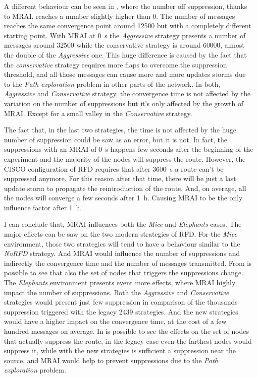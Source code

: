 A different behaviour can be seen in
,
where the number off suppression, thanks to \ac{MRAI}, reaches a number slightly
higher than \num{0}.
The number of messages reaches the same convergence point around \num{12500} but
with a completely different starting point.
With \ac{MRAI} at \SI{0}{\second} the \textit{Aggressive} strategy presents a number of
messages around \num{32500} while the conservative strategy is around \num{60000},
almost the double of the \textit{Aggressive} one.
This huge difference is caused by the fact that the \textit{conservative} strategy requires
more flaps to overcome the suppression threshold, and all those messages can
cause more and more updates storms due to the \textit{Path exploration} problem
in other parts of the network.
In both, \textit{Aggressive} and \textit{Conservative} strategy, the convergence
time is not affected by the variation on the number of suppressions but it's only
affected by the growth of \ac{MRAI}.
Except for a small valley in the \textit{Conservative} strategy.

The fact that, in the last two strategies, the time is not affected by the huge number
of suppression could be saw as an error, but it is not.
In fact, the suppressions with an \ac{MRAI} of \SI{0}{\second} happens
few seconds after the beginning of the experiment and the majority of the nodes
will suppress the route.
However, the CISCO configuration of \ac{RFD} requires that after \SI{3600}{\second} a route
can't be suppressed anymore.
For this reason after that time, there will be just a last update storm to propagate
the reintroduction of the route.
And, on average, all the nodes will converge a few seconds after \SI{1}{\hour}.
Causing \ac{MRAI} to be the only influence factor after \SI{1}{\hour}.

I can conclude that, \ac{MRAI} influences both the \textit{Mice} and
\textit{Elephants} cases.
The major effects can be saw on the two modern strategies of \ac{RFD}.
For the \textit{Mice} environment, those two strategies will tend to have
a behaviour similar to the \textit{NoRFD} strategy. And \ac{MRAI} would
influence the number of suppressions and indirectly the convergence time
and the number of messages transmitted.
From  is possible to see that also the set of
nodes that triggers the suppressions change.
The \textit{Elephants} environment presents event more effects, where
\ac{MRAI} highly impact the number of suppressions.
Both the \textit{Aggressive} and \textit{Conservative} strategies would present
just few suppression in comparison of the thousands suppression triggered with the
legacy \num{2439} strategies.
And the new strategies would have a higher impact on the convergence time, at
the cost of a few hundred messages on average.
In  is possible to see the effects
on the set of nodes that actually suppress the route, in the legacy
case even the farthest nodes would suppress it, while with the new
strategies is sufficient a suppression near the source, and \ac{MRAI} would
help to prevent suppressions due to the \textit{Path exploration} problem.

